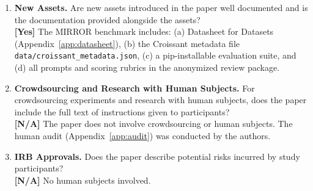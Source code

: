 \documentclass[10pt]{article}
\begin{document}
\begin{enumerate}
\item \textbf{New Assets.} Are new assets introduced in the paper well documented and is the documentation provided alongside the assets?
\\\textbf{[Yes]} The MIRROR benchmark includes: (a) Datasheet for Datasets (Appendix~\ref{app:datasheet}), (b) the Croissant metadata file \texttt{data/croissant\_metadata.json}, (c) a pip-installable evaluation suite, and (d) all prompts and scoring rubrics in the anonymized review package.

\item \textbf{Crowdsourcing and Research with Human Subjects.} For crowdsourcing experiments and research with human subjects, does the paper include the full text of instructions given to participants?
\\\textbf{[N/A]} The paper does not involve crowdsourcing or human subjects. The human audit (Appendix~\ref{app:audit}) was conducted by the authors.

\item \textbf{IRB Approvals.} Does the paper describe potential risks incurred by study participants?
\\\textbf{[N/A]} No human subjects involved.

\end{enumerate}
\end{document}
